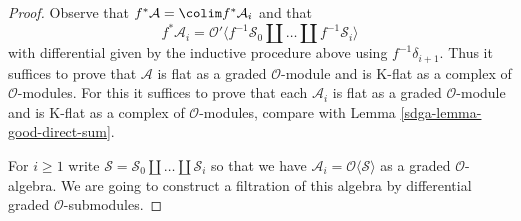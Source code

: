 \begin{proof}

Observe that $f^*\mathcal{A} = \colim f^*\mathcal{A}_i$
and that
$$
f^*\mathcal{A}_i = \mathcal{O}'\langle
f^{-1}\mathcal{S}_0 \amalg \ldots \amalg f^{-1}\mathcal{S}_i\rangle
$$
with differential given by the inductive procedure above using
$f^{-1}\delta_{i + 1}$. Thus it suffices to prove that $\mathcal{A}$
is flat as a graded $\mathcal{O}$-module and
is K-flat as a complex of $\mathcal{O}$-modules.
For this it suffices to prove that each $\mathcal{A}_i$
is flat as a graded $\mathcal{O}$-module and
is K-flat as a complex of $\mathcal{O}$-modules, compare with
Lemma \ref{sdga-lemma-good-direct-sum}.


\medskip\noindent
For $i \geq 1$
write $\mathcal{S} = \mathcal{S}_0 \amalg \ldots \amalg \mathcal{S}_i$
so that we have $\mathcal{A}_i = \mathcal{O}\langle \mathcal{S} \rangle$
as a graded $\mathcal{O}$-algebra. We are going to construct a filtration
of this algebra by differential graded $\mathcal{O}$-submodules.


\end{proof}
